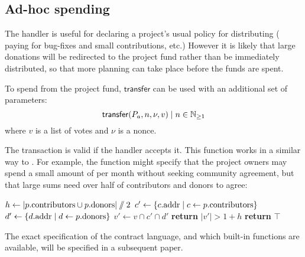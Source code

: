 
\subsection{Ad-hoc spending}

The handler  is useful for declaring a project's usual policy for distributing \oscoin{}
(\eg{} paying for bug-fixes and small contributions, etc.) However it is likely
that large donations will be redirected to the project fund rather than be
immediately distributed, so that more planning can take place before the funds
are spent.

To spend \oscoin{} from the project fund, $\mathsf{transfer}$ can be used with an
additional set of parameters:
\[
    \mathsf{transfer}\lparen P_a, n, \nu, v\rparen \mid n \in \mathbb{N}_{\geq 1}
\]
where $v$ is a list of votes and $\nu$ is a nonce.

The transaction is valid if the handler  accepts
it. This function works in a similar way to . For
example, the function might specify that the project owners may spend a small
amount of \oscoin{} per month without seeking community agreement, but that
large sums need over half of contributors and donors to agree:
\medskip
\begin{algorithmic}[0]
            \State $h \gets |p.{\mathrm{contributors}} \cup p.{\mathrm{donors}}| \sslash 2$
            \State $c' \gets \{ c.{\mathrm{addr}} \mid c \gets p.{\mathrm{contributors}} \}$
            \State $d' \gets \{ d.{\mathrm{addr}} \mid d \gets p.{\mathrm{donors}} \}$
            \State $v' \gets v \cap c' \cap d'$
            \State \textbf{return} $|v'| > 1 + h$
            \Else
            \State \textbf{return} $\top$
        \EndIf
    \EndProcedure
\end{algorithmic}

The exact specification of the contract language, and which built-in functions
are available, will be specified in a subsequent paper.
